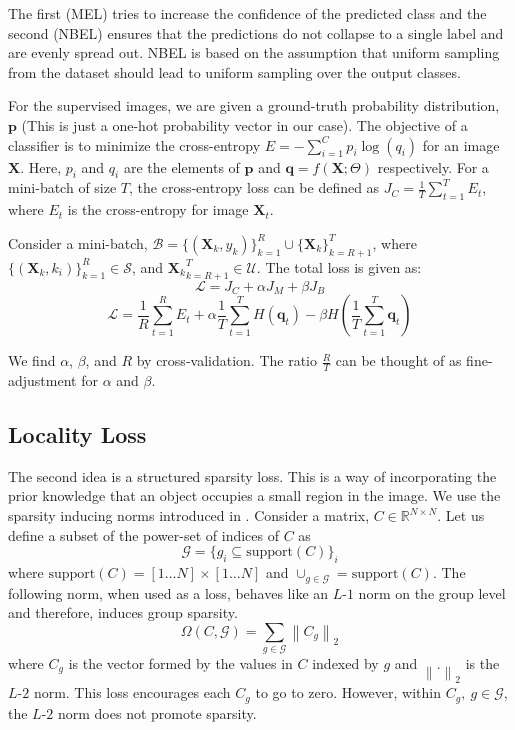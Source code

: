 \documentclass[runningheads]{llncs}
\begin{document}
The first (MEL) tries to increase the confidence of the predicted class and the second (NBEL)
ensures that the predictions do not collapse to a single label and are evenly spread out. NBEL
is based on the assumption that uniform sampling from the dataset should lead to uniform sampling
over the output classes.

For the supervised images, we are given a ground-truth probability distribution, $\mathbf{p}$ (This is
just a one-hot probability vector in our case). The objective of a classifier is to minimize the
cross-entropy $E = -\sum_{i=1}^{C}p_i \log(q_i)$ for an image $\mathbf{X}$. Here, $p_i$ and $q_i$
are the elements of $\mathbf{p}$ and $\mathbf{q} = f(\mathbf{X}; \Theta)$ respectively. For a
mini-batch of size $T$, the cross-entropy loss can be defined as $J_C = \frac{1}{T} \sum_{t=1}^{T}
E_t$, where $E_t$ is the cross-entropy for image $\mathbf{X}_t$.

Consider a mini-batch, $\mathcal{B} =
\{(\mathbf{X}_k, y_k)\}_{k=1}^R \cup \{\mathbf{X}_k\}_{k=R+1}^T$, where $\{(\mathbf{X}_k,
k_i)\}_{k=1}^{R} \in \mathcal{S}$, and ${\mathbf{X}_k}_{k=R+1}^{T} \in \mathcal{U}$. The total loss
is given as:
\begin{equation}
	\mathcal{L} = J_C + \alpha J_M + \beta J_B
\end{equation}
\begin{equation}
	\mathcal{L} = \frac{1}{R} \sum_{t=1}^{R} E_t + \alpha \frac{1}{T}\sum_{t=1}^{T}H(\mathbf{q}_t) -
	\beta H(\frac{1}{T}\sum_{t=1}^{T}\mathbf{q}_t)
\end{equation}

We find $\alpha$, $\beta$, and $R$ by cross-validation. The ratio $\frac{R}{T}$ can be thought of as
fine-adjustment for $\alpha$ and $\beta$.


\subsection{Locality Loss}
The second idea is a structured sparsity loss. This is a way of incorporating the prior knowledge
that an object occupies a small region in the image. We use the sparsity inducing norms introduced in
\cite{groupsparsity,sparsepca}. Consider a matrix, $C \in \mathbb{R}^{N \times
N}$. Let us define a subset of the power-set of indices of $C$ as
\begin{equation}
	\mathcal{G} = \{g_i \subseteq \textrm{support}(C)\}_i
\end{equation}
where $\textrm{support}(C) = [1 \dots N] \times [1 \dots N]$ and $\cup_{g \in \mathcal{G}} = \textrm{support}(C)$. The following norm, when used as a
loss, behaves like an $L$-$1$ norm on the group level and therefore, induces group sparsity.
\begin{equation}
	\Omega (C, \mathcal{G}) = \sum_{g \in \mathcal{G}} \left\lVert C_g \right\rVert _2
\end{equation}
where $C_g$ is the vector formed by the values in $C$ indexed by $g$ and $\left\lVert . \right\rVert_2$ is
the $L$-$2$ norm. This loss encourages each $C_g$ to go to zero. However, within $C_g,~g
\in \mathcal{G}$, the $L$-$2$ norm does not promote sparsity.
\end{document}
